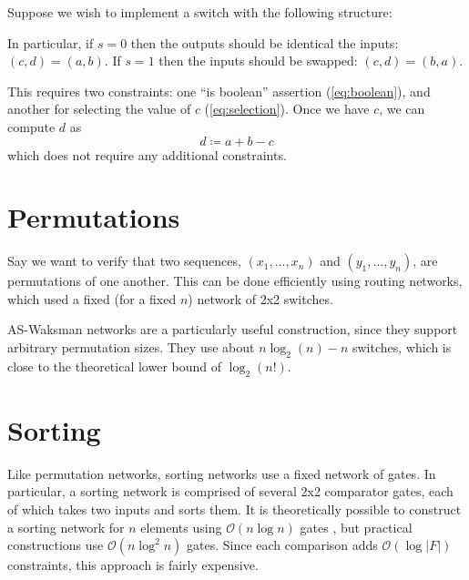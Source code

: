 \documentclass{article}
\begin{document}
Suppose we wish to implement a switch with the following structure:
\begin{center}
\end{center}
In particular, if $s = 0$ then the outputs should be identical the inputs: $(c, d) = (a, b)$. If $s = 1$ then the inputs should be swapped: $(c, d) = (b, a)$.

This requires two constraints: one ``is boolean'' assertion (\autoref{eq:boolean}), and another for selecting the value of $c$ (\autoref{eq:selection}). Once we have $c$, we can compute $d$ as
\begin{equation}
  d \coloneqq a + b - c
\end{equation}
which does not require any additional constraints.


\section{Permutations} \label{sec:permutations}

Say we want to verify that two sequences, $(x_1, \dots, x_n)$ and $(y_1, \dots, y_n)$, are permutations of one another. This can be done efficiently using routing networks, which used a fixed (for a fixed $n$) network of 2x2 switches.

AS-Waksman networks \cite{beauquier2002arbitrary} are a particularly useful construction, since they support arbitrary permutation sizes. They use about $n \log_2(n) - n$ switches, which is close to the theoretical lower bound of $\log_2(n!)$.


\section{Sorting}

Like permutation networks, sorting networks use a fixed network of gates. In particular, a sorting network is comprised of several 2x2 comparator gates, each of which takes two inputs and sorts them. It is theoretically possible to construct a sorting network for $n$ elements using $\mathcal{O}(n \log n)$ gates \cite{ajtai19830}, but practical constructions use $\mathcal{O}(n \log^2 n)$ gates. Since each comparison adds $\mathcal{O}(\log |F|)$ constraints, this approach is fairly expensive.
\end{document}
